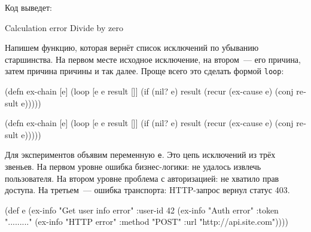 \fi

\noindent
Код выведет:

\begin{english}
  \begin{text}
Calculation error
Divide by zero
  \end{text}
\end{english}

Напишем функцию, которая вернёт список исключений по убыванию
старшинства. На первом месте исходное исключение, на втором~--- его причина, затем
причина причины и так далее. Проще всего это сделать формой \verb|loop|:


\ifx\DEVICETYPE\MOBILE

\begin{english}
  \begin{clojure}
(defn ex-chain [e]
  (loop [e e
         result []]
    (if (nil? e)
      result
      (recur (ex-cause e)
        (conj result e)))))
  \end{clojure}
\end{english}

\else

\begin{english}
  \begin{clojure}
(defn ex-chain [e]
  (loop [e e
         result []]
    (if (nil? e)
      result
      (recur (ex-cause e) (conj result e)))))
  \end{clojure}
\end{english}

\fi

Для экспериментов объявим переменную \verb|e|. Это цепь исключений из трёх
звеньев. На первом уровне ошибка бизнес-логики: не удалось извлечь
пользователя. На втором уровне проблема с авторизацией: не хватило прав
доступа. На третьем~--- ошибка транспорта: HTTP-запрос вернул статус 403.

\label{e-sample}

\ifx\DEVICETYPE\MOBILE

\begin{english}
  \begin{clojure}
(def e
  (ex-info
   "Get user info error"
   {:user-id 42}
   (ex-info
     "Auth error"
     {:token "........."}
     (ex-info
       "HTTP error"
       {:method "POST"
        :url "http://api.site.com"}))))
  \end{clojure}
\end{english}

